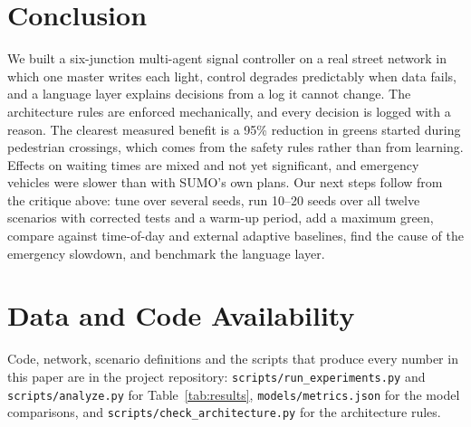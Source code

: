 \documentclass[conference]{IEEEtran}
\begin{document}
\section{Conclusion}

We built a six-junction multi-agent signal controller on a real street network in which
one master writes each light, control degrades predictably when data fails, and a language
layer explains decisions from a log it cannot change. The architecture rules are enforced
mechanically, and every decision is logged with a reason. The clearest measured benefit is
a 95\% reduction in greens started during pedestrian crossings, which comes from the safety
rules rather than from learning. Effects on waiting times are mixed and not yet
significant, and emergency vehicles were slower than with SUMO's own plans. Our next steps
follow from the critique above: tune over several seeds, run 10--20 seeds over all twelve
scenarios with corrected tests and a warm-up period, add a maximum green, compare against
time-of-day and external adaptive baselines, find the cause of the emergency slowdown, and
benchmark the language layer.

\section*{Data and Code Availability}
Code, network, scenario definitions and the scripts that produce every number in this
paper are in the project repository: \texttt{scripts/run\_experiments.py} and
\texttt{scripts/analyze.py} for Table~\ref{tab:results}, \texttt{models/metrics.json} for the
model comparisons, and \texttt{scripts/check\_architecture.py} for the architecture rules.



\end{document}
